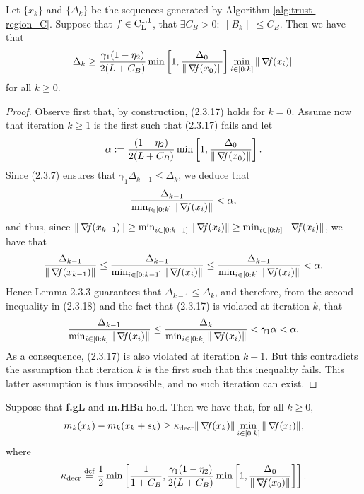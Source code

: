 \documentclass[10pt,a4paper]{article}
\begin{document}
\begin{lemma}
	Let $\{x_k\}$ and $\{\Delta_k\}$ be the sequences generated by Algorithm \ref{alg:trust-region_C}. Suppose that $f\in \mathord{\mathrm{C^{1,1}_{L}}}$, that $\exists C_B>0: \|B_k\| \leq C_B$. Then we have that
	\begin{equation*}
		\Delta_k \geq \frac{\gamma_1(1 - \eta_2)}{2(L + C_B)} \min \left[ 1, \frac{\Delta_0}{\|\operatorname*{\mathit{\nabla \!f}}(x_0)\|} \right] \min_{i \in [0:k]} \|\operatorname*{\mathit{\nabla \!f}}(x_i)\|
	\end{equation*}
	for all $k \geq 0$.
\end{lemma}
\begin{proof}
Observe first that, by construction, (2.3.17) holds for $k = 0$. Assume now that iteration $k \geq 1$ is the first such that (2.3.17) fails and let
\begin{equation*}
	\alpha := \frac{(1 - \eta_2)}{2(L + C_B)} \min \left[ 1, \frac{\Delta_0}{\|\operatorname*{\mathit{\nabla \!f}}(x_0)\|} \right].
\end{equation*}
Since (2.3.7) ensures that $\gamma_1 \Delta_{k-1} \leq \Delta_k$, we deduce that
\begin{equation*}
	\frac{\Delta_{k-1}}{\min_{i \in [0:k]} \|\operatorname*{\mathit{\nabla \!f}}(x_i)\|} < \alpha,
\end{equation*}
and thus, since $\|\operatorname*{\mathit{\nabla \!f}}(x_{k-1})\| \geq \min_{i \in [0:k-1]} \|\operatorname*{\mathit{\nabla \!f}}(x_i)\| \geq \min_{i \in [0:k]} \|\operatorname*{\mathit{\nabla \!f}}(x_i)\|$, we have that
\begin{equation*}
	\frac{\Delta_{k-1}}{\|\operatorname*{\mathit{\nabla \!f}}(x_{k-1})\|} \leq \frac{\Delta_{k-1}}{\min_{i \in [0:k-1]} \|\operatorname*{\mathit{\nabla \!f}}(x_i)\|} \leq \frac{\Delta_{k-1}}{\min_{i \in [0:k]} \|\operatorname*{\mathit{\nabla \!f}}(x_i)\|} < \alpha.
\end{equation*}
Hence Lemma 2.3.3 guarantees that $\Delta_{k-1} \leq \Delta_k$, and therefore, from the second inequality in (2.3.18) and the fact that (2.3.17) is violated at iteration $k$, that
\begin{equation*}
	\frac{\Delta_{k-1}}{\min_{i \in [0:k]} \|\operatorname*{\mathit{\nabla \!f}}(x_i)\|} \leq \frac{\Delta_k}{\min_{i \in [0:k]} \|\operatorname*{\mathit{\nabla \!f}}(x_i)\|} < \gamma_1 \alpha < \alpha.
\end{equation*}
As a consequence, (2.3.17) is also violated at iteration $k - 1$. But this contradicts the assumption that iteration $k$ is the first such that this inequality fails. This latter assumption is thus impossible, and no such iteration can exist. 
\end{proof}

\begin{lemma}
	Suppose that \textbf{f.gL} and \textbf{m.HBa} hold. Then we have that, for all $k \geq 0$,
	\begin{equation*}
		m_k(x_k) - m_k(x_k + s_k) \geq \kappa_{\text{decr}} \|\operatorname*{\mathit{\nabla \!f}}(x_k)\| \min_{i \in [0:k]} \|\operatorname*{\mathit{\nabla \!f}}(x_i)\|,
	\end{equation*}
	where
	\begin{equation*}
		\kappa_{\text{decr}} \stackrel{\text{def}}{=} \frac{1}{2} \min \left[ \frac{1}{1 + C_B}, \frac{\gamma_1(1 - \eta_2)}{2(L + C_B)} \min \left[ 1, \frac{\Delta_0}{\|\operatorname*{\mathit{\nabla \!f}}(x_0)\|} \right] \right].
	\end{equation*}
\end{lemma}
\end{document}
